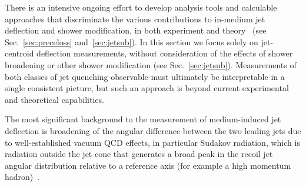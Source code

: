 There is an intensive ongoing effort to develop analysis tools and calculable approaches that discriminate the various contributions to in-medium jet deflection and shower modification, in both experiment and theory~\cite{Andrews:2018jcm} (see Sec.~\ref{sec:preceloss} and~\ref{sec:jetsub}). In this section we focus solely on jet-centroid deflection measurements, without consideration of the effects of shower broadening or other shower modification (see Sec.~\ref{sec:jetsub}). Measurements of both classes of jet quenching observable must ultimately be interpretable in a single consistent picture, but such an approach is beyond current experimental and theoretical capabilities. %

The most significant background to the measurement of medium-induced jet deflection is broadening of the angular difference between the two leading jets due to well-established vacuum QCD effects, in particular Sudakov radiation, which is radiation outside the jet cone that generates a broad peak in the recoil jet angular distribution relative to a reference axis (for example a high momentum hadron)~\cite{Chen:2016vem,Mueller:2016xoc}. %


